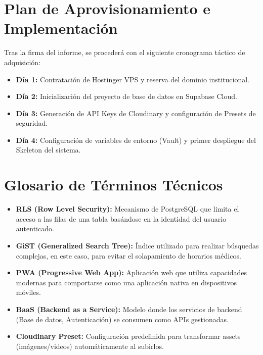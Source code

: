 \documentclass[a4paper,12pt]{article}
\begin{document}
\section{Plan de Aprovisionamiento e Implementación}
Tras la firma del informe, se procederá con el siguiente cronograma táctico de adquisición:
\begin{itemize}[label=$\Rightarrow$]
    \item \textbf{Día 1:} Contratación de Hostinger VPS y reserva del dominio institucional.
    \item \textbf{Día 2:} Inicialización del proyecto de base de datos en Supabase Cloud.
    \item \textbf{Día 3:} Generación de API Keys de Cloudinary y configuración de Presets de seguridad.
    \item \textbf{Día 4:} Configuración de variables de entorno (Vault) y primer despliegue del Skeleton del sistema.
\end{itemize}

\newpage
\section{Glosario de Términos Técnicos}
\begin{itemize}[leftmargin=*, label=$\square$]
    \item \textbf{RLS (Row Level Security):} Mecanismo de PostgreSQL que limita el acceso a las filas de una tabla basándose en la identidad del usuario autenticado.
    \item \textbf{GiST (Generalized Search Tree):} Índice utilizado para realizar búsquedas complejas, en este caso, para evitar el solapamiento de horarios médicos.
    \item \textbf{PWA (Progressive Web App):} Aplicación web que utiliza capacidades modernas para comportarse como una aplicación nativa en dispositivos móviles.
    \item \textbf{BaaS (Backend as a Service):} Modelo donde los servicios de backend (Base de datos, Autenticación) se consumen como APIs gestionadas.
    \item \textbf{Cloudinary Preset:} Configuración predefinida para transformar assets (imágenes/videos) automáticamente al subirlos.
\end{itemize}

\end{document}
